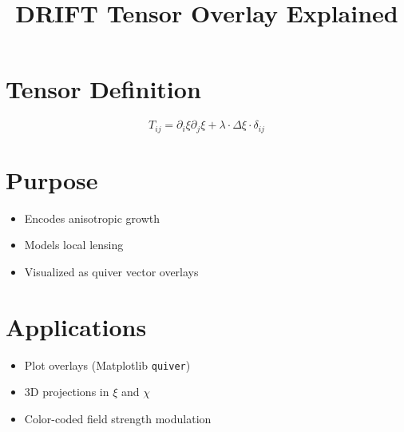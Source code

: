 \documentclass{article}
\title{DRIFT Tensor Overlay Explained}
\author{}
\date{}
\begin{document}
\maketitle

\section*{Tensor Definition}

\[
T_{ij} = \partial_i \xi \partial_j \xi + \lambda \cdot \Delta \xi \cdot \delta_{ij}
\]

\section*{Purpose}

\begin{itemize}
  \item Encodes anisotropic growth
  \item Models local lensing
  \item Visualized as quiver vector overlays
\end{itemize}

\section*{Applications}

\begin{itemize}
  \item Plot overlays (Matplotlib \texttt{quiver})
  \item 3D projections in $\xi$ and $\chi$
  \item Color-coded field strength modulation
\end{itemize}
\end{document}

